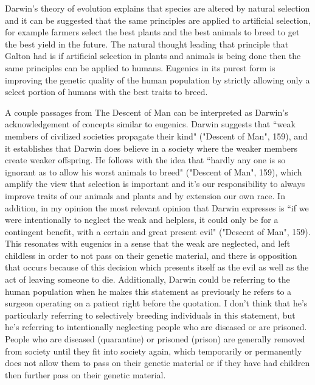 \documentclass[11pt, oneside]{article}
\begin{document}
\par Darwin's theory of evolution explains that species are altered by natural selection and it can be suggested that the same principles are applied to artificial selection, for example farmers select the best plants and the best animals to breed to get the best yield in the future. The natural thought leading that principle that Galton had is if artificial selection in plants and animals is being done then the same principles can be applied to humans. Eugenics in its purest form is improving the genetic quality of the human population by strictly allowing only a select portion of humans with the best traits to breed. 
\par A couple passages from The Descent of Man can be interpreted as Darwin's acknowledgement of concepts similar to eugenics. Darwin suggests that ``weak members of civilized societies propagate their kind" ("Descent of Man", 159), and it establishes that Darwin does believe in a society where the weaker members create weaker offspring. He follows with the idea that ``hardly any one is so ignorant as to allow his worst animals to breed" ("Descent of Man", 159), which amplify the view that selection is important and it's our responsibility to always improve traits of our animals and plants and by extension our own race. In addition, in my opinion the most relevant opinion that Darwin expresses is  ``if we were intentionally to neglect the weak and helpless, it could only be for a contingent benefit, with a certain and great present evil" ("Descent of Man", 159). This resonates with eugenics in a sense that the weak are neglected, and left childless in order to not pass on their genetic material, and there is opposition that occurs because of this decision which presents itself as the evil as well as the act of leaving someone to die. Additionally, Darwin could be referring to the human population when he makes this statement as previously he refers to a surgeon operating on a patient right before the quotation. I don't think that he's particularly referring to selectively breeding individuals in this statement, but he's referring to intentionally neglecting people who are diseased or are prisoned. People who are diseased (quarantine) or prisoned (prison) are generally removed from society until they fit into society again, which temporarily or permanently does not allow them to pass on their genetic material or if they have had children then further pass on their genetic material. 
\end{document}
